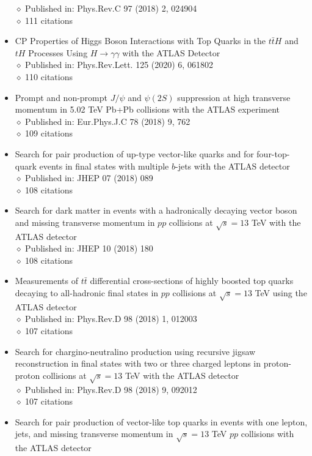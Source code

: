 \documentclass[margin, 10pt]{res} %
\begin{document}
\begin{resume}
\begin{itemize}
$\diamond$ Published in: Phys.Rev.C 97 (2018) 2, 024904\\
$\diamond$ 111 citations
\item CP Properties of Higgs Boson Interactions with Top Quarks in the $t\bar{t}H$ and $tH$ Processes Using $H \rightarrow \gamma \gamma$ with the ATLAS Detector\\
$\diamond$ Published in: Phys.Rev.Lett. 125 (2020) 6, 061802\\
$\diamond$ 110 citations
\item Prompt and non-prompt $J/\psi$ and $\psi(2S)$ suppression at high transverse momentum in 5.02 TeV Pb+Pb collisions with the ATLAS experiment\\
$\diamond$ Published in: Eur.Phys.J.C 78 (2018) 9, 762\\
$\diamond$ 109 citations
\item Search for pair production of up-type vector-like quarks and for four-top-quark events in final states with multiple $b$-jets with the ATLAS detector\\
$\diamond$ Published in: JHEP 07 (2018) 089\\
$\diamond$ 108 citations
\item Search for dark matter in events with a hadronically decaying vector boson and missing transverse momentum in $pp$ collisions at $\sqrt{s} = 13$ TeV with the ATLAS detector\\
$\diamond$ Published in: JHEP 10 (2018) 180\\
$\diamond$ 108 citations
\item Measurements of $t\bar{t}$ differential cross-sections of highly boosted top quarks decaying to all-hadronic final states in $pp$ collisions at $\sqrt{s} = 13$ TeV using the ATLAS detector\\
$\diamond$ Published in: Phys.Rev.D 98 (2018) 1, 012003\\
$\diamond$ 107 citations
\item Search for chargino-neutralino production using recursive jigsaw reconstruction in final states with two or three charged leptons in proton-proton collisions at $\sqrt{s} = 13$ TeV with the ATLAS detector\\
$\diamond$ Published in: Phys.Rev.D 98 (2018) 9, 092012\\
$\diamond$ 107 citations
\item Search for pair production of vector-like top quarks in events with one lepton, jets, and missing transverse momentum in $\sqrt{s} = 13$ TeV $pp$ collisions with the ATLAS detector\\

\end{itemize}
\end{resume}
\end{document}
